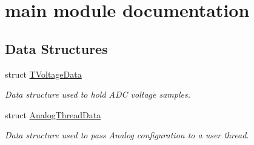\hypertarget{group__main__module}{}\section{main module documentation}
\label{group__main__module}
\subsection*{Data Structures}
\begin{DoxyCompactItemize}
\item 
struct \hyperlink{struct_t_voltage_data}{T\+Voltage\+Data}
\begin{DoxyCompactList}\small\item\em Data structure used to hold A\+D\+C voltage samples. \end{DoxyCompactList}\item 
struct \hyperlink{struct_analog_thread_data}{Analog\+Thread\+Data}
\begin{DoxyCompactList}\small\item\em Data structure used to pass Analog configuration to a user thread. \end{DoxyCompactList}\end{DoxyCompactItemize}
